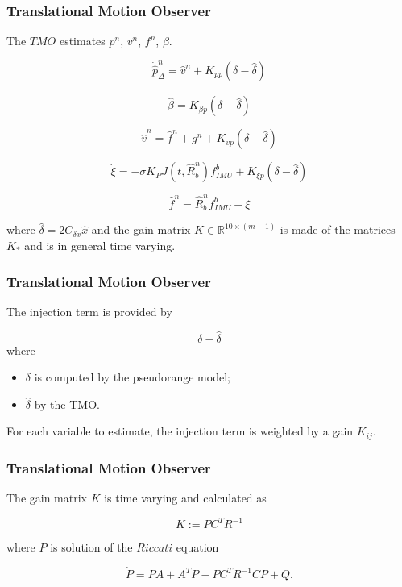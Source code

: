 \documentclass{beamer}
\begin{document}
	\begin{frame}
		\frametitle{Translational Motion Observer}
		The $TMO$ estimates $p^n$, $v^n$, $f^n$, $\beta$.
		
		\[ \dot{\hat{p}}^n_\Delta = \hat{v}^n + K_{pp}(\delta - \hat{\delta})  \]
		
		\[ \dot{\hat{\beta}} = K_{\beta p} (\delta - \hat{\delta}) \]
		
		\[ \dot{\hat{v}}^n = \hat{f}^n + g^n + K_{vp}(\delta - \hat{\delta})\]
		
		\[ \dot{\xi} = - \sigma K_P J(t, \hat{R}^n_b)f^b_{IMU} + K_{\xi p}(\delta - \hat{\delta}) \]
		
		\[ \hat{f}^n = \hat{R}^n_b f^b_{IMU} + \xi  \]
		
		where $\hat{\delta} = 2C_{\delta x}\hat{x}$ and the gain matrix $K \in \mathds{R}^{10\times(m-1)}$ is made of the matrices $K_*$ and is in general time varying.
	\end{frame}

	\begin{frame}
		\frametitle{Translational Motion Observer}
		The injection term is provided by
		
		\[  \delta - \hat{\delta} \]
		where
		\begin{itemize}
			\item $\delta$ is computed by the pseudorange model;
			\item $\hat{\delta}$ by the TMO.
		\end{itemize}
	
	For each variable to estimate, the injection term is weighted by a gain $K_{ij}$.		
	\end{frame}

	\begin{frame}
		\frametitle{Translational Motion Observer}
		The gain matrix $K$ is time varying and calculated as
		
		\[ K := PC^TR^{-1} \]
		
		where $P$ is solution of the $Riccati$ equation
		
		\[ \dot{P} = PA + A^TP - PC^TR^{-1}CP + Q.\]
	\end{frame}

		
\end{document}
